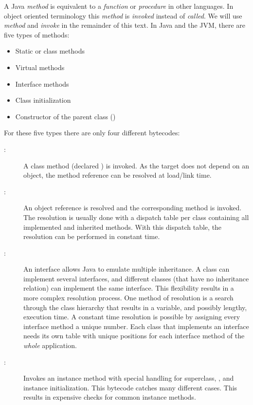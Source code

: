 A Java \emph{method} is equivalent to a \emph{function} or
\emph{procedure} in other languages. In object oriented terminology
this \emph{method} is \emph{invoked} instead of \emph{called}. We
will use \emph{method} and \emph{invoke} in the remainder of this
text. In Java and the JVM, there are five types of methods:
%
\begin{itemize}
    \item Static or class methods
    \item Virtual methods
    \item Interface methods
    \item Class initialization
    \item Constructor of the parent class ()
\end{itemize}
%
For these five types there are only four different bytecodes:
\begin{description}
    \item[:] A class method (declared )
    is invoked. As the target does not depend on an object, the
    method reference can be resolved at load/link time.

    \item[:] An object reference is resolved and
    the corresponding method is invoked. The resolution is usually
    done with a dispatch table per class containing all implemented and
    inherited methods. With this dispatch table, the resolution can
    be performed in constant time.

    \item[:] An interface allows Java
    to emulate multiple inheritance. A class can implement several
    interfaces, and different classes (that have no inheritance
    relation) can implement the same interface. This flexibility
    results in a more complex resolution process. One method of
    resolution is a search through the class hierarchy that results
    in a variable, and possibly lengthy, execution time. A constant time
    resolution is possible by assigning every interface method a
    unique number. Each class that implements an interface needs its
    own table with unique positions for each interface method of
    the \emph{whole} application.

    \item[:] Invokes an instance method with
    special handling for superclass, , and instance
    initialization. This bytecode catches many different cases.
    This results in expensive checks for common  instance
    methods.
\end{description}
%

